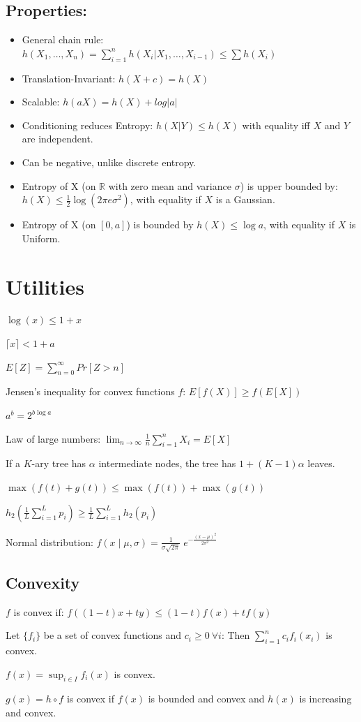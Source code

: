 \documentclass[10pt,a4paper,landscape]{article}
\begin{document}
\begin{multicols*}{4}
\subsection{Properties:}
\begin{itemize}
	\item General chain rule: $h(X_1, \ldots, X_n) = \sum_{i=1}^{n} h(X_i|X_1, \ldots, X_{i-1}) \leq \sum h(X_i)$
	\item Translation-Invariant: $h(X + c) = h(X)$
	\item Scalable: $h(aX) = h(X) + log|a|$
	\item Conditioning reduces Entropy: $h(X|Y) \leq h(X)$ with equality iff $X$ and $Y$ are independent.
	\item Can be negative, unlike discrete entropy.
	\item Entropy of X (on $\mathbb{R}$ with zero mean and variance $\sigma$) is upper bounded by: $h(X) \leq \frac{1}{2} \log ( 2\pi e \sigma^2)$, with equality if $X$ is a Gaussian.
	\item Entropy of X (on $[0, a]$) is bounded by $h(X) \leq \log a$, with equality if $X$ is Uniform.
\end{itemize}





\section{Utilities}
$\log(x) \leq 1 + x$

$\lceil x \rceil < 1 + a$

$E[Z] = \sum_{n=0}^{\infty} Pr[Z > n]$

Jensen's inequality for convex functions $f$: $ E[f(X)] \geq f(E[X])$

$a^b = 2^{ b \log a}$

Law of large numbers: $\lim_{n \rightarrow \infty} \frac{1}{n} \sum_{i=1}^n X_i = E[X]$

If a $K$-ary tree has $\alpha$ intermediate nodes, the tree has $1+(K-1)\alpha$ leaves.


$\max(f(t) + g(t)) \leq \max(f(t)) + \max(g(t))$


$h_2 \left(\frac{1}{L}\sum_{i=1}^L p_i \right) \geq \frac{1}{L} \sum_{i=1}^L h_2(p_i)$

Normal distribution: $f(x \; | \; \mu, \sigma) = \frac{1}{\sigma\sqrt{2\pi} } \; e^{ -\frac{(x-\mu)^2}{2\sigma^2} }$

\subsection{Convexity}

$f$ is convex if: $f((1-t)x+ t y)\leq (1-t) f(x)+ t f(y)$

Let $\{f_i\}$ be a set of convex functions and $c_i \geq 0 \ \forall i$:
Then $\sum_{i=1}^n c_i f_i(x_i)$ is convex.

$f(x) = \sup_{i \in I} f_i(x)$ is convex.

$g(x) = h \circ f$ is convex if $f(x)$ is bounded and convex and $h(x)$ is increasing and convex.
\end{multicols*}
\end{document}
